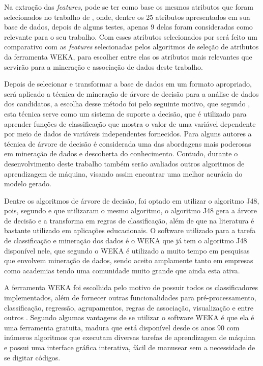 \par
Na extração das \textit{features}, pode se ter como base os mesmos atributos que foram selecionados no trabalho de , onde, dentre os 25 atributos apresentados em sua base de dados, depois de alguns testes, apenas 9 delas foram consideradas como relevante para o seu trabalho. Com esses atributos selecionados por  será feito um comparativo com as \textit{features} selecionadas pelos algoritmos de seleção de atributos da ferramenta WEKA, para escolher entre elas os atributos mais relevantes que servirão para a mineração e associação de dados deste trabalho.


\par
Depois de selecionar e transformar a base de dados em um formato apropriado, será aplicado a técnica de mineração de árvore de decisão para a análise de dados dos candidatos, a escolha desse método foi pelo seguinte motivo, que segundo , esta técnica serve como um sistema de suporte a decisão, que é utilizado para aprender funções de classificação que mostra o valor de uma variável dependente por meio de dados de variáveis independentes fornecidos. Para alguns autores a técnica de árvore de decisão é considerada uma das abordagens mais poderosas em mineração de dados e descoberta do conhecimento. Contudo, durante o desenvolvimento deste trabalho também serão avaliados outros algoritmos de aprendizagem de máquina, visando assim encontrar uma melhor acurácia do modelo gerado.

\par
Dentre os algoritmos de árvore de decisão, foi optado em utilizar o algoritmo J48, pois, segundo  e  que utilizaram o mesmo algoritmo, o algoritmo J48 gera a árvore de decisão e a transforma em regras de classificação, além de que na literatura é bastante utilizado em aplicações educacionais. O software utilizado para a tarefa de classificação e mineração dos dados é o WEKA que já tem o algoritmo J48 disponível nele, que segundo  o WEKA é utilizado a muito tempo em pesquisas que envolvem mineração de dados, sendo aceito amplamente tanto em empresas como academias tendo uma comunidade muito grande que ainda esta ativa.

\par
A ferramenta WEKA foi escolhida pelo motivo de possuir todos os classificadores implementados, além de fornecer outras funcionalidades para pré-processamento, classificação, regressão, agrupamentos, regras de associação, visualização e entre outros \cite{Camilo2009}. Segundo  algumas vantagens de se utilizar o software WEKA é que ela é uma ferramenta gratuita, madura que está disponível desde os anos 90 com inúmeros algoritmos que executam diversas tarefas de aprendizagem de máquina e possui uma interface gráfica interativa, fácil de manusear sem a necessidade de se digitar códigos. 

